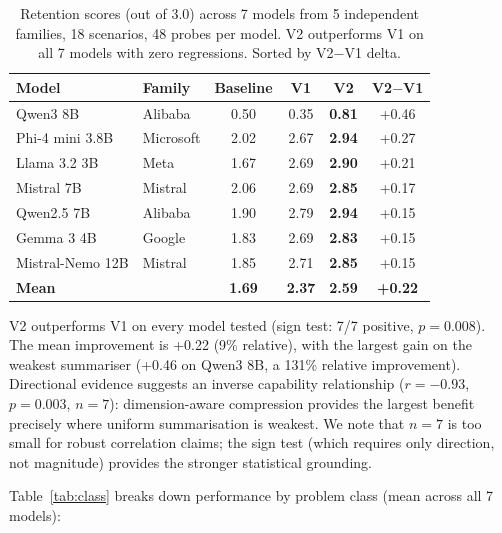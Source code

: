 \documentclass[11pt,a4paper]{article}
\begin{document}
\begin{table}[H]
\centering
\begin{tabular}{@{}llcccc@{}}
\toprule
\textbf{Model} & \textbf{Family} & \textbf{Baseline} & \textbf{V1} & \textbf{V2} & \textbf{V2$-$V1} \\
\midrule
Qwen3 8B & Alibaba & 0.50 & 0.35 & \textbf{0.81} & +0.46 \\
Phi-4 mini 3.8B & Microsoft & 2.02 & 2.67 & \textbf{2.94} & +0.27 \\
Llama 3.2 3B & Meta & 1.67 & 2.69 & \textbf{2.90} & +0.21 \\
Mistral 7B & Mistral & 2.06 & 2.69 & \textbf{2.85} & +0.17 \\
Qwen2.5 7B & Alibaba & 1.90 & 2.79 & \textbf{2.94} & +0.15 \\
Gemma 3 4B & Google & 1.83 & 2.69 & \textbf{2.83} & +0.15 \\
Mistral-Nemo 12B & Mistral & 1.85 & 2.71 & \textbf{2.85} & +0.15 \\
\midrule
\textbf{Mean} & & \textbf{1.69} & \textbf{2.37} & \textbf{2.59} & \textbf{+0.22} \\
\bottomrule
\end{tabular}
\caption{Retention scores (out of 3.0) across 7 models from 5 independent families, 18 scenarios, 48 probes per model. V2 outperforms V1 on all 7 models with zero regressions. Sorted by V2$-$V1 delta.}
\label{tab:overall}
\end{table}

\noindent V2 outperforms V1 on every model tested (sign test: 7/7 positive, $p = 0.008$). The mean improvement is +0.22 (9\% relative), with the largest gain on the weakest summariser (+0.46 on Qwen3 8B, a 131\% relative improvement). Directional evidence suggests an inverse capability relationship ($r = -0.93$, $p = 0.003$, $n=7$): dimension-aware compression provides the largest benefit precisely where uniform summarisation is weakest. We note that $n=7$ is too small for robust correlation claims; the sign test (which requires only direction, not magnitude) provides the stronger statistical grounding.

Table~\ref{tab:class} breaks down performance by problem class (mean across all 7 models):
\end{document}
